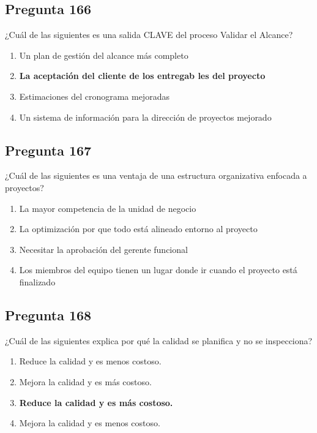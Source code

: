 \documentclass[11pt,a4paper]{article}
\begin{document}
\subsection*{Pregunta 166}
¿Cuál de las siguientes es una salida CLAVE del proceso Validar el Alcance?

\begin{enumerate}[label=\alph*)]
  \item Un plan de gestión del alcance más completo
  \item \textbf{La aceptación del cliente de los entregab les del proyecto}
  \item Estimaciones del cronograma mejoradas
  \item Un sistema de información para la dirección de proyectos mejorado
\end{enumerate}

\subsection*{Pregunta 167}
¿Cuál de las siguientes es una ventaja de una estructura organizativa enfocada a proyectos?

\begin{enumerate}[label=\alph*)]
  \item La mayor competencia de la unidad de negocio
  \item La optimización por que todo está alineado entorno al proyecto
  \item Necesitar la aprobación del gerente funcional
  \item Los miembros del equipo tienen un lugar donde ir cuando el proyecto está finalizado
\end{enumerate}

\subsection*{Pregunta 168}
¿Cuál de las siguientes explica por qué la calidad se planifica y no se inspecciona?

\begin{enumerate}[label=\alph*)]
  \item Reduce la calidad y es menos costoso.
  \item Mejora la calidad y es más costoso.
  \item \textbf{Reduce la calidad y es más costoso.}
  \item Mejora la calidad y es menos costoso.
\end{enumerate}
\end{document}
